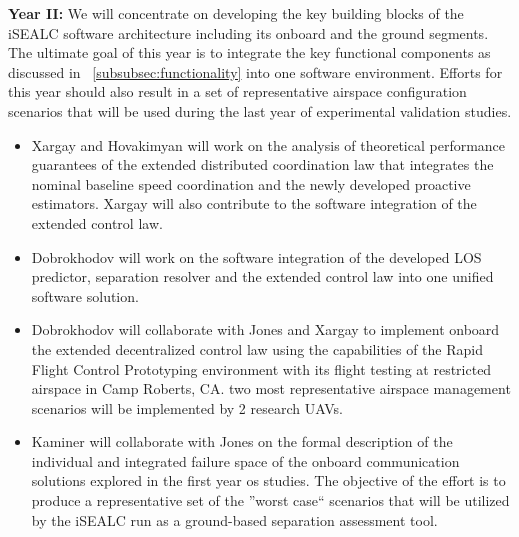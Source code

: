 \documentclass[letter,onecolumn,12pt]{aiaa-tc}
\newcommand{\1}{1_n}
\begin{document}
\textbf{Year II:} We will concentrate on developing the key building blocks of the iSEALC software architecture
including its onboard and the ground segments. The ultimate goal of this year is to integrate the key functional
components as discussed in ~\ref{subsubsec:functionality} into one software environment. Efforts for this year
should also result in a set of representative airspace configuration scenarios that will be used during the last
year of experimental validation studies.
\vspace{-3mm}
\begin{itemize}
\setlength{\itemsep}{-4pt}
    \item Xargay and Hovakimyan will work on the analysis of theoretical performance guarantees of the extended distributed coordination law that integrates the nominal baseline speed coordination and the newly developed proactive estimators. Xargay will also contribute to the software integration of the extended control law.

    \item Dobrokhodov will work on the software integration of the developed LOS predictor, separation resolver and the extended control law into one unified software solution.

    \item Dobrokhodov will collaborate with Jones and Xargay to implement onboard the extended decentralized control law using the capabilities of the Rapid Flight Control Prototyping environment with its flight testing at restricted airspace in Camp Roberts, CA. two most representative airspace management scenarios will be implemented by 2 research UAVs.

    \item Kaminer will collaborate with Jones on the formal description of the individual and integrated failure space of the onboard communication solutions explored in the first year os studies. The objective of the effort is to produce a representative set of the ''worst case`` scenarios that will be utilized by the iSEALC run as a ground-based separation assessment tool.
\end{itemize}
\vspace{-2mm}
\end{document}
